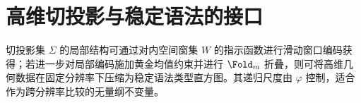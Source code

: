 \section{高维切投影与稳定语法的接口}\label{app:high-dimensional-cut-project}

切投影集 $\Sigma$ 的局部结构可通过对内空间窗集 $W$ 的指示函数进行滑动窗口编码获得；若进一步对局部编码施加黄金均值约束并进行 $\Fold_m$ 折叠，则可将高维几何数据在固定分辨率下压缩为稳定语法类型直方图。其递归尺度由 $\varphi$ 控制，适合作为跨分辨率比较的无量纲不变量。
